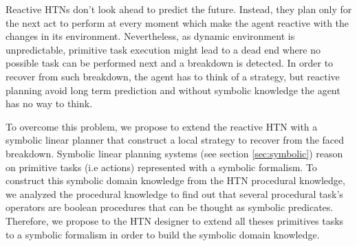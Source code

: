 \documentclass[conference]{IEEEtran}
\begin{document}
	\par Reactive HTNs don't look ahead to predict the future. Instead, they plan only for the next act to perform at every moment which make the agent reactive with the changes in its environment.  Nevertheless, as dynamic environment is unpredictable,  primitive task execution might lead to a dead end where no possible task can be performed next and a breakdown is detected. In order to recover from such breakdown, the agent has to think of a strategy, but reactive planning avoid long term prediction and without symbolic knowledge the agent has no way to think. 
	\par To overcome this problem, we propose to extend the reactive HTN with a symbolic linear planner that construct a local strategy to recover from the faced breakdown. Symbolic linear planning systems (see section \ref{sec:symbolic}) reason on primitive tasks (i.e actions)   represented with a symbolic formalism. To construct this symbolic domain knowledge from the HTN procedural knowledge, we analyzed the procedural knowledge to find out that several procedural task's operators are boolean procedures that can be thought as symbolic predicates. Therefore, we propose to the HTN designer to extend all theses primitives tasks to a symbolic formalism in order to build the symbolic domain knowledge.                               
\end{document}
